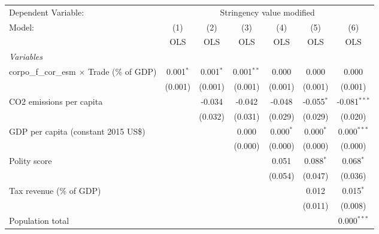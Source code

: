 
\begingroup
\centering
\begin{tabular}{lcccccc}
   \toprule
   Dependent Variable: & \multicolumn{6}{c}{Stringency value modified}\\
   Model:                                             & (1)         & (2)         & (3)          & (4)         & (5)          & (6)\\  
                                                      &  OLS        & OLS         & OLS          & OLS         & OLS          & OLS\\  
   \midrule
   \emph{Variables}\\
   corpo\_f\_cor\_esm $\times$ Trade (\% of GDP)      & 0.001$^{*}$ & 0.001$^{*}$ & 0.001$^{**}$ & 0.000       & 0.000        & 0.000\\   
                                                      & (0.001)     & (0.001)     & (0.001)      & (0.001)     & (0.001)      & (0.001)\\   
   CO2 emissions per capita                           &             & -0.034      & -0.042       & -0.048      & -0.055$^{*}$ & -0.081$^{***}$\\   
                                                      &             & (0.032)     & (0.031)      & (0.029)     & (0.029)      & (0.020)\\   
   GDP per capita (constant 2015 US\$)                &             &             & 0.000        & 0.000$^{*}$ & 0.000$^{*}$  & 0.000$^{***}$\\   
                                                      &             &             & (0.000)      & (0.000)     & (0.000)      & (0.000)\\   
   Polity score                                       &             &             &              & 0.051       & 0.088$^{*}$  & 0.068$^{*}$\\   
                                                      &             &             &              & (0.054)     & (0.047)      & (0.036)\\   
   Tax revenue (\% of GDP)                            &             &             &              &             & 0.012        & 0.015$^{*}$\\   
                                                      &             &             &              &             & (0.011)      & (0.008)\\   
   Population total                                   &             &             &              &             &              & 0.000$^{***}$\\   

\end{tabular}
